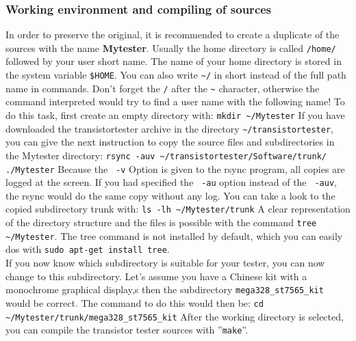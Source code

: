 \subsubsection{Working environment and compiling of sources}
\label{sec:Arbeitsumgebung}
In order to preserve the original, it is recommended to create a duplicate
of the sources with the name \textbf{Mytester}.
Usually the home directory is called \verb"/home/" followed by your user short name.
The name of your home directory is stored in the system variable \verb"$HOME".
You can also write \verb"~/" in short instead of the full path name in commands. 
Don't forget the \verb"/" after the \verb"~" character, otherwise the command
interpreted would try to find a user name with the following name!
To do this task, first create an empty directory with: 
\large{\newline\verb"mkdir ~/Mytester"\newline}
If you have downloaded the transistortester archive in the directory \verb"~/transistortester",
you can give the next instruction to copy the source files and subdirectories
in the Mytester directory:
\large{\newline\verb"rsync -auv ~/transistortester/Software/trunk/ ./Mytester"\newline}
Because the \verb" -v" Option is given to the rsync program, all
copies are logged at the screen.
If you had specified the \verb" -au" option instead of the \verb" -auv",
the rsync would do the same copy without any log.
You can take a look to the copied subdirectory trunk with:
\large{\newline\verb"ls -lh ~/Mytester/trunk"\newline}
A clear representation of the directory structure and the files is possible with the
command \verb "tree ~/Mytester".
The tree command is not installed by default, which you can easily dos
with \verb"sudo apt-get install tree".\\

If you now know which subdirectory is suitable for your tester,
you can now change to this subdirectory.
Let's assume you have a Chinese kit with a monochrome graphical display,s
then the subdirectory \verb"mega328_st7565_kit" would be correct.
The command to do this would then be:
\large{\newline\verb"cd ~/Mytester/trunk/mega328_st7565_kit"\newline}
After the working directory is selected, you can compile the
transistor tester sources with ''\verb"make"''.\\

